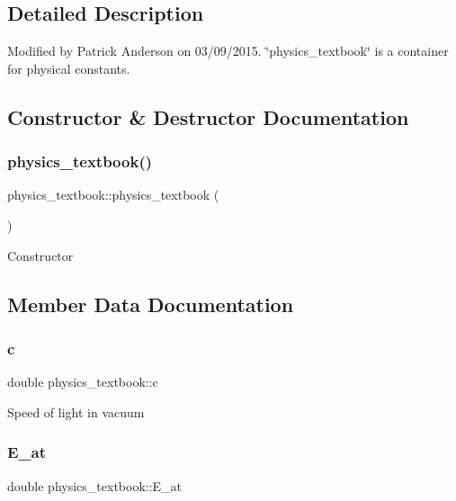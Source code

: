 \subsection{Detailed Description}
Modified by Patrick Anderson on 03/09/2015. \char`\"{}physics\+\_\+textbook\char`\"{} is a container for physical constants. 

\subsection{Constructor \& Destructor Documentation}
\mbox{\label{classphysics__textbook_a89b6993c2aecf444cd2fa540c73a110b}} 
\subsubsection{\texorpdfstring{physics\_textbook()}{physics\_textbook()}}
{\footnotesize\ttfamily physics\+\_\+textbook\+::physics\+\_\+textbook (\begin{DoxyParamCaption}{ }\end{DoxyParamCaption})}

Constructor 

\subsection{Member Data Documentation}
\mbox{\label{classphysics__textbook_a3c6dd19f14166d6c90d6f53aa4e31885}} 
\subsubsection{\texorpdfstring{c}{c}}
{\footnotesize\ttfamily double physics\+\_\+textbook\+::c}

Speed of light in vacuum \mbox{\label{classphysics__textbook_aed1451ff3400dce39969e5ac319f033a}} 
\subsubsection{\texorpdfstring{E\_at}{E\_at}}
{\footnotesize\ttfamily double physics\+\_\+textbook\+::\+E\+\_\+at}

